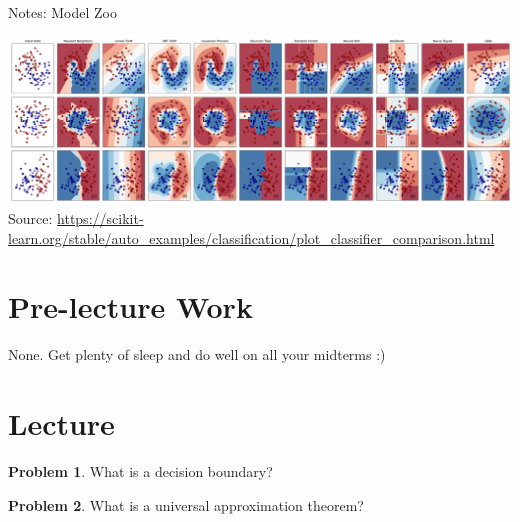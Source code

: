 \documentclass[10pt]{article}
\theoremstyle{definition}
\newtheorem{problem}{Problem}
\begin{document}
\begin{center}
\Huge
Notes: Model Zoo
\end{center}

\begin{center}
    \hspace*{-0.75in}\includegraphics[width=8in]{sphx_glr_plot_classifier_comparison_001}
    \small
    Source: \url{https://scikit-learn.org/stable/auto_examples/classification/plot_classifier_comparison.html}
\end{center}


\section{Pre-lecture Work}

None.
Get plenty of sleep and do well on all your midterms :)



\section{Lecture}

\begin{problem}
    What is a decision boundary?
\end{problem}

\newpage
\begin{problem}
    What is a universal approximation theorem?
\end{problem}
\end{document}
